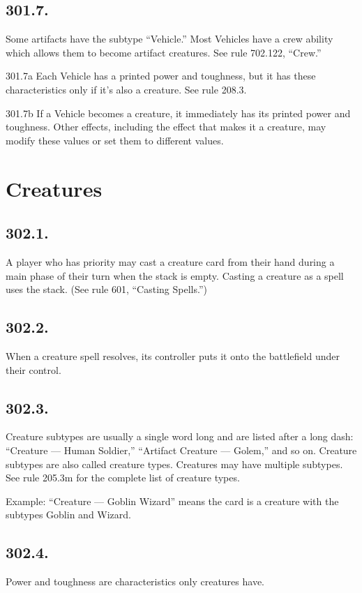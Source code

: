 \subsection*{301.7.}
Some artifacts have the subtype “Vehicle.” Most Vehicles have a crew ability which allows them to become artifact creatures. See rule 702.122, “Crew.”

301.7a Each Vehicle has a printed power and toughness, but it has these characteristics only if it’s also a creature. See rule 208.3.

301.7b If a Vehicle becomes a creature, it immediately has its printed power and toughness. Other effects, including the effect that makes it a creature, may modify these values or set them to different values.

\section{Creatures}
\subsection*{302.1.}
A player who has priority may cast a creature card from their hand during a main phase of their turn when the stack is empty. Casting a creature as a spell uses the stack. (See rule 601, “Casting Spells.”)

\subsection*{302.2.}
When a creature spell resolves, its controller puts it onto the battlefield under their control.

\subsection*{302.3.}
Creature subtypes are usually a single word long and are listed after a long dash: “Creature — Human Soldier,” “Artifact Creature — Golem,” and so on. Creature subtypes are also called creature types. Creatures may have multiple subtypes. See rule 205.3m for the complete list of creature types.

Example: “Creature — Goblin Wizard” means the card is a creature with the subtypes Goblin and Wizard.

\subsection*{302.4.}
Power and toughness are characteristics only creatures have.

